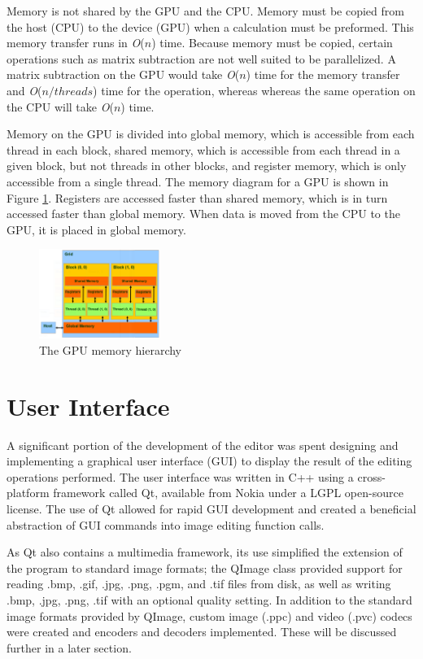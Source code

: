 \documentclass[10pt,twocolumn,twoside]{IEEEtran}
\renewcommand{\O}[1]{\textit{O}(\ensuremath{#1})}
\begin{document}
Memory is not shared by the GPU and the CPU. Memory must be copied from the host (CPU) to the device (GPU) when a calculation must be preformed. This memory transfer runs in \O{n} time. Because memory must be copied, certain operations such as matrix subtraction are not well suited to be parallelized. A matrix subtraction on the GPU would take \O{n} time for the memory transfer and \O{n/threads} time for the operation, whereas whereas the same operation on the CPU will take \O{n} time.

Memory on the GPU is divided into global memory, which is accessible from each thread in each block, shared memory, which is accessible from each thread in a given block, but not threads in other blocks, and register memory, which is only accessible from a single thread. The memory diagram for a GPU is shown in Figure \ref{fig:cudaMem}. Registers are accessed faster than shared memory, which is in turn accessed faster than global memory. When data is moved from the CPU to the GPU, it is placed in global memory.

\begin{figure}[h]
\begin{center}
\includegraphics[width=0.35\textwidth]{Images/cudaMem.png}
\caption{The GPU memory hierarchy}
\label{fig:cudaMem}
\end{center}
\end{figure}

\section{User Interface}
A significant portion of the development of the editor was spent designing and implementing a graphical user interface (GUI) to display the result of the editing operations performed. The user interface was written in C++ using a cross-platform framework called Qt, available from Nokia under a LGPL open-source license. The use of Qt allowed for rapid GUI development and created a beneficial abstraction of GUI commands into image editing function calls. 

As Qt also contains a multimedia framework, its use simplified the extension of the program to standard image formats; the QImage class provided support for reading .bmp, .gif, .jpg, .png, .pgm, and .tif files from disk, as well as writing .bmp, .jpg, .png, .tif with an optional quality setting. In addition to the standard image formats provided by QImage, custom image (.ppc) and video (.pvc) codecs were created and encoders and decoders implemented. These will be discussed further in a later section.
\end{document}
